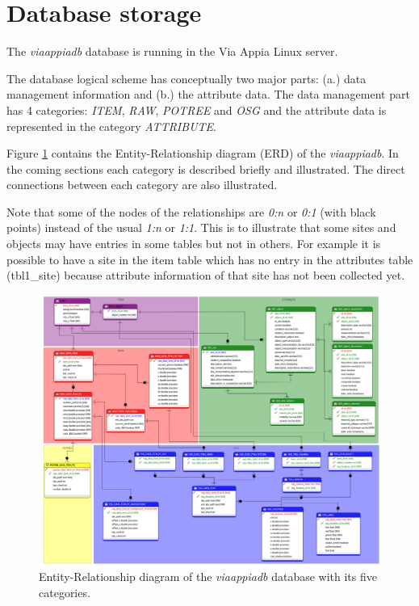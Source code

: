 \section{Database storage}
\label{sec:database}

The \textit{viaappiadb} database is running in the Via Appia Linux server.

The database logical scheme has conceptually two major parts: (a.) data management
information and (b.) the attribute data. The  data management part has 4 categories:
{\em ITEM}, {\em RAW}, {\em POTREE} and {\em OSG} and the attribute data is represented in the category {\em ATTRIBUTE}.
 
Figure \ref{fig:db_erdb} contains the Entity-Relationship diagram (ERD) of the
\textit{viaappiadb}. In the coming sections each category is described briefly and
illustrated. The direct connections between each category are also illustrated.

Note that some of the nodes of the relationships are \textit{0:n} or
\textit{0:1} (with black points) instead of the usual \textit{1:n} or
\textit{1:1}. This is to illustrate that some sites and objects may have
entries in some tables but not in others. For example it is possible to have a
site in the item table which has no entry in the attributes table (tbl1\_site) because attribute information of that site has not been collected yet.

\begin{figure}[H]
\centering
\includegraphics[scale=0.25]{fig/database/ERDB.pdf}
\caption{Entity-Relationship diagram of the \textit{viaappiadb} database with
its five categories.}
\label{fig:db_erdb}
\end{figure}

